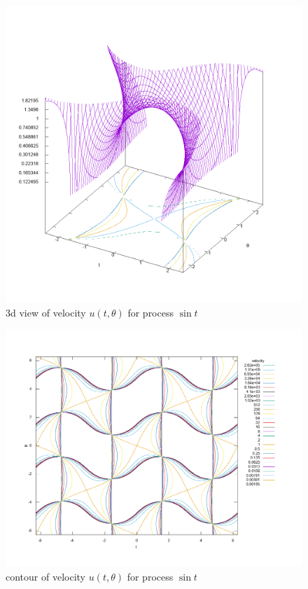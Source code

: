\documentclass{article}
\begin{document}
\begin{figure}[ht]
\centering
\includegraphics[width=5.5in]{plot/sine3d.png}
\caption{3d view of velocity $u(t, \theta)$ for process $\sin t$}
\end{figure}

\begin{figure}[ht]
\centering
\includegraphics[width=5.5in]{plot/sine2d.png}
\caption{contour of velocity $u(t, \theta)$ for process $\sin t$}
\end{figure}
\end{document}
